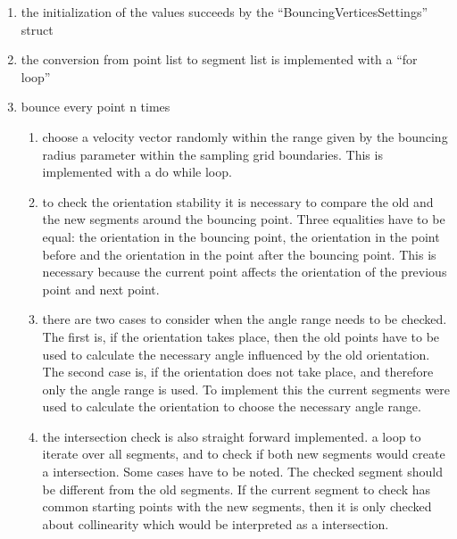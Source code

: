 \begin{enumerate}
  \item the initialization of the values succeeds by the
    ``BouncingVerticesSettings'' struct
  \item the conversion from point list to segment list is implemented
    with a ``for loop''
  \item bounce every point n times
  \begin{enumerate}
    \item choose a velocity vector randomly within the range given
      by the bouncing radius parameter within the sampling grid
      boundaries. This is implemented with a do while loop.
    \item to check the orientation stability it is necessary to
      compare the old and the new segments around the bouncing point.
      Three equalities have to be equal: the orientation in the
      bouncing point, the orientation in the point before and the
      orientation in the point after the bouncing point. This is
      necessary because the current point affects the orientation of
      the previous point and next point.
    \item there are two cases to consider when the angle range needs
      to be checked. The first is, if the orientation takes place,
      then the old points have to be used to calculate the necessary
      angle influenced by the old orientation. The second case is, if
      the orientation does not take place, and therefore only the
      angle range is used. To implement this the current segments
      were used to calculate the orientation to choose the necessary
      angle range.
    \item the intersection check is also straight forward implemented.
      a loop to iterate over all segments, and to check if both new
      segments would create a intersection. Some cases have to be
      noted. The checked segment should be different from the old
      segments. If the current segment to check has common starting
      points with the new segments, then it is only checked about
      collinearity which would be interpreted as a intersection.
  \end{enumerate}
\end{enumerate}


